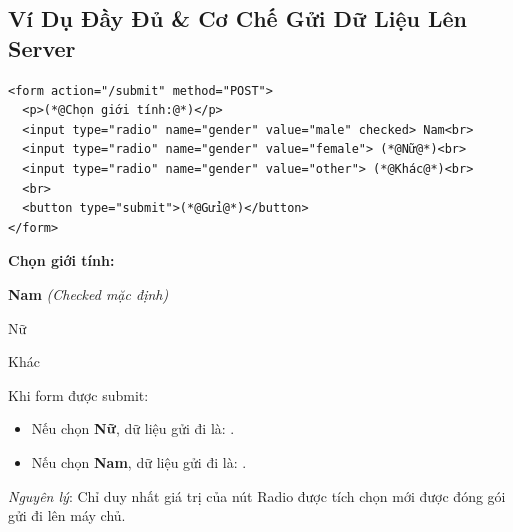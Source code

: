 \subsection{Ví Dụ Đầy Đủ \& Cơ Chế Gửi Dữ Liệu Lên Server}

\begin{codeWindow}
\begin{lstlisting}[language=HTML5]
<form action="/submit" method="POST">
  <p>(*@Chọn giới tính:@*)</p>
  <input type="radio" name="gender" value="male" checked> Nam<br>
  <input type="radio" name="gender" value="female"> (*@Nữ@*)<br>
  <input type="radio" name="gender" value="other"> (*@Khác@*)<br>
  <br>
  <button type="submit">(*@Gửi@*)</button>
</form>
\end{lstlisting}
\end{codeWindow}

\begin{browserWindow}
\sffamily\small
\textbf{Chọn giới tính:} \\[6pt]
 \; \textbf{Nam} \quad \textcolor{codeComment}{\small\textit{(Checked mặc định)}} \\[4pt]
 \; Nữ \\[4pt]
 \; Khác \\[8pt]
\end{browserWindow}

\begin{tipBox}
Khi form được submit:
\begin{itemize}[leftmargin=1.5em, itemsep=2pt, parsep=0pt]
    \item Nếu chọn \textbf{Nữ}, dữ liệu gửi đi là: .
    \item Nếu chọn \textbf{Nam}, dữ liệu gửi đi là: .
\end{itemize}
\textit{Nguyên lý}: Chỉ duy nhất giá trị  của nút Radio được tích chọn mới được đóng gói gửi đi lên máy chủ.
\end{tipBox}

